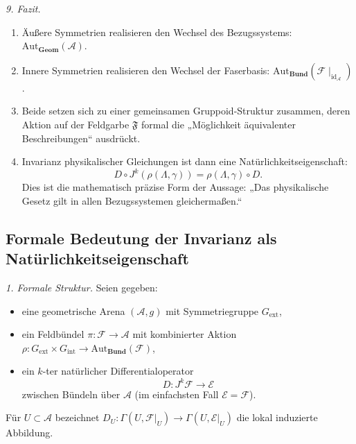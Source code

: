 \documentclass[10pt, letterpaper]{article}
\newcommand{\Aut}{\mathrm{Aut}}
\begin{document}
\bigskip
\emph{9. Fazit.}
\begin{enumerate}
\item Äußere Symmetrien realisieren den Wechsel des Bezugssystems:
\(\Aut_{\mathbf{Geom}}(\mathcal A)\).
\item Innere Symmetrien realisieren den Wechsel der Faserbasis:
\(\Aut_{\mathbf{Bund}}(\mathcal F\mid_{\mathrm{id}_\mathcal A})\).
\item Beide setzen sich zu einer gemeinsamen Gruppoid-Struktur zusammen,
deren Aktion auf der Feldgarbe \(\mathfrak F\) formal die
„Möglichkeit äquivalenter Beschreibungen“ ausdrückt.
\item Invarianz physikalischer Gleichungen ist dann eine Natürlichkeitseigenschaft:
\[
D\circ J^k(\rho(\Lambda,\gamma))
=\rho(\Lambda,\gamma)\circ D.
\]
Dies ist die mathematisch präzise Form der Aussage:
„Das physikalische Gesetz gilt in allen Bezugssystemen gleichermaßen.“
\end{enumerate}


\pagebreak


\subsection{Formale Bedeutung der Invarianz als Natürlichkeitseigenschaft}

\emph{1. Formale Struktur.}
Seien gegeben:
\begin{itemize}
\item eine geometrische Arena $(\mathcal A,g)$ mit Symmetriegruppe $G_{\mathrm{ext}}$,
\item ein Feldbündel $\pi:\mathcal F\to\mathcal A$ mit kombinierter Aktion
      $\rho:G_{\mathrm{ext}}\times G_{\mathrm{int}}\to\Aut_{\mathbf{Bund}}(\mathcal F)$,
\item ein $k$-ter natürlicher Differentialoperator
      \[
      D:J^k\mathcal F\longrightarrow\mathcal E
      \]
      zwischen Bündeln über $\mathcal A$ (im einfachsten Fall $\mathcal E=\mathcal F$).
\end{itemize}
Für $U\subset\mathcal A$ bezeichnet $D_U:\Gamma(U,\mathcal F|_U)\to\Gamma(U,\mathcal E|_U)$
die lokal induzierte Abbildung.  
\end{document}
